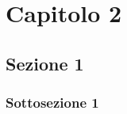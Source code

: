 \chapter{Capitolo 2}
\justify
\blindtext
\section{Sezione 1}
\justify
\blindtext
\subsection{Sottosezione 1}
\justify
\blindtext
